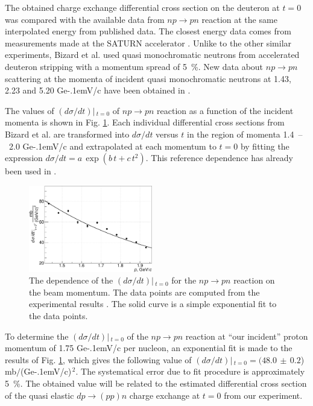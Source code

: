 \documentclass[twocolumn,epjc3]{svjour3}
\newcommand{\np}     {\ensuremath{np \rightarrow pn}\xspace}
\newcommand{\dpchex} {\ensuremath{dp \rightarrow (pp)n}\xspace}
\newcommand{\GeVc}   {Ge\kern-.1emV/c\xspace}
\begin{document}
The obtained charge exchange differential cross section on the deuteron at $t=0$
was compared with the available data from \np reaction at the same interpolated
energy from published data. The closest energy data comes from measurements made
at the SATURN accelerator \cite{biz75,bys78}. Unlike to the other similar
experiments, Bizard et al. \cite{biz75} used quasi monochromatic neutrons from
accelerated deuteron stripping with a momentum spread of 5~\%. New data about
\np scattering at the momenta of incident quasi monochromatic neutrons at 1.43,
2.23 and 5.20 \GeVc have been obtained in \cite{tro14}.

The values of $(d\sigma/dt)|\,_{t=0}$ of \np reaction as a function of the
incident momenta is shown in Fig. \ref{fig:npsigma}. Each individual
differential cross sections from Bizard et al. \cite{biz75} are transformed into
$d\sigma/dt$ versus $t$ in the region of momenta 1.4~--~2.0 \GeVc and
extrapolated at each momentum to $t=0$ by fitting the expression
$d\sigma/dt = a\,\exp(b\,t + c\,t^2)$. This reference dependence has already
been used in \cite{gla08}.

\begin{figure}[ht]
  \centering
  \includegraphics[width=0.48\textwidth]{np_dSigma.pdf}
  \caption{The dependence of the $(d\sigma/dt)|\,_{t=0}$ for the \np reaction on
    the beam momentum. The data points are computed from the experimental
    results \cite{biz75}. The solid curve is a simple exponential fit to the
    data points.}
  \label{fig:npsigma}
\end{figure}

To determine the $(d\sigma/dt)|\,_{t=0}$ of the \np reaction at ``our incident''
proton momentum of 1.75 \GeVc per nucleon, an exponential fit is made to the
results of Fig. \ref{fig:npsigma}, which gives the following value of
$(d\sigma/dt)|\,_{t=0} = (48.0\,\pm\,0.2$) mb$/$(\GeVc)$^{\,2}$. The
systematical error due to fit procedure is approximately 5~\%. The obtained
value will be related to the estimated differential cross section of the quasi
elastic \dpchex charge exchange at $t=0$ from our experiment.
\end{document}
